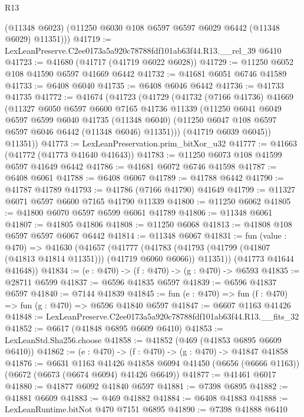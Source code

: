 \begin{lexlean}{R13}
\begin{coremodule}
        (@11348 @6023)
        (@11250 @6030 @108 @6597 @6597 @6029 @6442 (@11348 @6029) @11351)))
@41719 := LexLeanPreserve.C2ee0173a5a920c78788fdf101ab63f44.R13.__rel_39 @6410
@41723 := @41680 (@41717 (@41719 @6022 @6028))
@41729 := @11250 @6052 @108 @41590 @6597 @41669 @6442
@41732 := @41681 @6051 @6746 @41589
@41733 := @6408 @6040
@41735 := @6408 @6046 @6442
@41736 := @41733 @41735
@41772 := @41674
    (@41723
      (@41729
        (@41732
          (@7166 @41736)
          @41669
          (@11327
            @6050
            @6597
            @6600
            @7165
            @41736
            @11339
            (@11250
              @6041
              @6049
              @6597
              @6599
              @6040
              @41735
              (@11348 @6040)
              (@11250 @6047 @108 @6597 @6597 @6046 @6442 (@11348 @6046) @11351)))
          (@41719 @6039 @6045))
        @11351))
@41773 := LexLeanPreservation.prim_bitXor_u32
@41777 := @41663 (@41772 (@41773 @41640 @41643))
@41783 := @11250 @6073 @108 @41599 @6597 @41649 @6442
@41786 := @41681 @6072 @6746 @41598
@41787 := @6408 @6061
@41788 := @6408 @6067
@41789 := @41788 @6442
@41790 := @41787 @41789
@41793 := @41786 (@7166 @41790) @41649
@41799 := @11327 @6071 @6597 @6600 @7165 @41790 @11339
@41800 := @11250 @6062
@41805 := @41800 @6070 @6597 @6599 @6061 @41789
@41806 := @11348 @6061
@41807 := @41805 @41806
@41808 := @11250 @6068
@41813 := @41808 @108 @6597 @6597 @6067 @6442
@41814 := @11348 @6067
@41831 := fun (value : @470) =>
  @41630
    (@41657
      (@41777
        (@41783 (@41793 (@41799 (@41807 (@41813 @41814 @11351))) (@41719 @6060 @6066)) @11351))
      (@41773 @41644 @41648))
@41834 := (e : @470) -> (f : @470) -> (g : @470) -> @6593
@41835 := @28711 @6599
@41837 := @6596 @41835 @6597
@41839 := @6596 @41837 @6597
@41840 := @7144 @41839
@41845 := fun (e : @470) => fun (f : @470) => fun (g : @470) => @6596 @41840 @6597
@41847 := @6607 @1163 @41426
@41848 := LexLeanPreserve.C2ee0173a5a920c78788fdf101ab63f44.R13.__fits_32
@41852 := @6617 (@41848 @6895 @6609 @6410)
@41853 := LexLeanStd.Sha256.choose
@41858 := @41852 (@469 (@41853 @6895 @6609 @6410))
@41862 := (e : @470) -> (f : @470) -> (g : @470) -> @41847 @41858
@41876 := @6631
    @1163
    @41426
    @41858
    @6094
    @41450
    (@6656 (@6666 @1163))
    (@6672 (@6673 (@6674 @6094) @41426 @6649))
@41877 := @41461 @6017
@41880 := @41877 @6092 @41840 @6597
@41881 := @7398 @6895
@41882 := @41881 @6609
@41883 := @469 @41882
@41884 := @6408 @41883
@41888 := LexLeanRuntime.bitNot @470 @7151 @6895
@41890 := @7398 @41888 @6410

\end{coremodule}
\end{lexlean}
